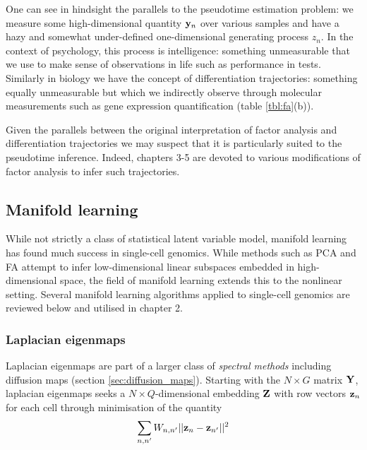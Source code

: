 One can see in hindsight the parallels to the pseudotime estimation problem: we measure some high-dimensional quantity $\mathbf{y}_n$ over various samples and have a hazy and somewhat under-defined one-dimensional generating process $z_n$. In the context of psychology, this process is intelligence: something unmeasurable that we use to make sense of observations in life such as performance in tests. Similarly in biology we have the concept of differentiation trajectories: something equally unmeasurable but which we indirectly observe through molecular measurements such as gene expression quantification (table \ref{tbl:fa}(b)).

Given the parallels between the original interpretation of factor analysis and differentiation trajectories we may suspect that it is particularly suited to the pseudotime inference. Indeed, chapters 3-5 are devoted to various modifications of factor analysis to infer such trajectories.




\subsection{Manifold learning} \label{sec:int:manifold}

While not strictly a class of statistical latent variable model, manifold learning has found much success in single-cell genomics. While methods such as PCA and FA attempt to infer low-dimensional linear subspaces embedded in high-dimensional space, the field of manifold learning extends this to the nonlinear setting. Several manifold learning algorithms applied to single-cell genomics are reviewed below and utilised in chapter 2.

\subsubsection{Laplacian eigenmaps}

Laplacian eigenmaps \cite{Belkin2003} are part of a larger class of \emph{spectral methods} including diffusion maps (section \ref{sec:diffusion_maps}). Starting with the $N \times G$ matrix $\mathbf{Y}$, laplacian eigenmaps seeks a $N \times Q$-dimensional embedding $\mathbf{Z}$ with row vectors $\mathbf{z}_n$ for each cell through minimisation of the quantity
\begin{equation}
  \sum_{n,n'} W_{n,n'}\lvert \lvert \mathbf{z}_n - \mathbf{z}_{n'}\rvert \rvert^2
\end{equation}

